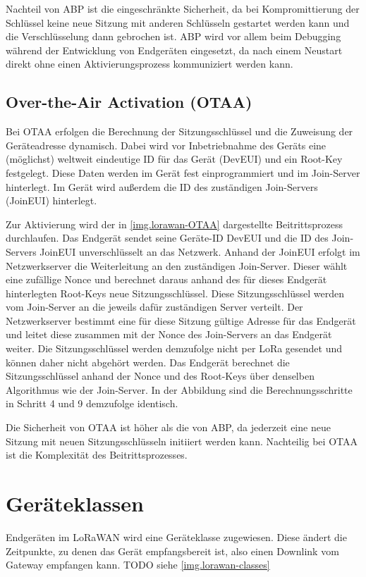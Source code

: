 Nachteil von \gls{ABP} ist die eingeschränkte Sicherheit, da bei Kompromittierung der Schlüssel keine neue Sitzung mit anderen Schlüsseln gestartet werden kann und die Verschlüsselung dann gebrochen ist.
\gls{ABP} wird vor allem beim Debugging während der Entwicklung von Endgeräten eingesetzt, da nach einem Neustart direkt ohne einen Aktivierungsprozess kommuniziert werden kann.


\subsection{Over-the-Air Activation (OTAA)}
Bei \gls{OTAA} erfolgen die Berechnung der Sitzungsschlüssel und die Zuweisung der Geräteadresse dynamisch.
Dabei wird vor Inbetriebnahme des Geräts eine (möglichst) weltweit eindeutige ID für das Gerät (DevEUI) und ein Root-Key festgelegt.
Diese Daten werden im Gerät fest einprogrammiert und im Join-Server hinterlegt.
Im Gerät wird außerdem die ID des zuständigen Join-Servers (JoinEUI) hinterlegt.

Zur Aktivierung wird der in \autoref{img.lorawan-OTAA} dargestellte Beitrittsprozess durchlaufen.
Das Endgerät sendet seine Geräte-ID DevEUI und die ID des Join-Servers JoinEUI unverschlüsselt an das Netzwerk.
Anhand der JoinEUI erfolgt im Netzwerkserver die Weiterleitung an den zuständigen Join-Server.
Dieser wählt eine zufällige Nonce und berechnet daraus anhand des für dieses Endgerät hinterlegten Root-Keys neue Sitzungsschlüssel.
Diese Sitzungsschlüssel werden vom Join-Server an die jeweils dafür zuständigen Server verteilt.
Der Netzwerkserver bestimmt eine für diese Sitzung gültige Adresse für das Endgerät und leitet diese zusammen mit der Nonce des Join-Servers an das Endgerät weiter.
Die Sitzungsschlüssel werden demzufolge nicht per LoRa gesendet und können daher nicht abgehört werden.
Das Endgerät berechnet die Sitzungsschlüssel anhand der Nonce und des Root-Keys über denselben Algorithmus wie der Join-Server.
In der Abbildung sind die Berechnungsschritte in Schritt 4 und 9 demzufolge identisch.

Die Sicherheit von \gls{OTAA} ist höher als die von \gls{ABP}, da jederzeit eine neue Sitzung mit neuen Sitzungsschlüsseln initiiert werden kann.
Nachteilig bei \gls{OTAA} ist die Komplexität des Beitrittsprozesses.



\section{Geräteklassen}\label{sec.lorawan.classes}
Endgeräten im LoRaWAN wird eine Geräteklasse zugewiesen.
Diese ändert die Zeitpunkte, zu denen das Gerät empfangsbereit ist, also einen Downlink vom Gateway empfangen kann.
TODO siehe \autoref{img.lorawan-classes}


